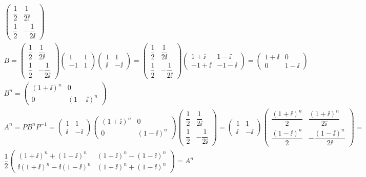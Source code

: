 \begin{gather*}
\left( \begin{array}{cc}
\dfrac{1}{2} & \dfrac{1}{2\ii}\\
\dfrac{1}{2} & -\dfrac{1}{2\ii}
\end{array} \right)\\
B=
\left( \begin{array}{cc}
\dfrac{1}{2} & \dfrac{1}{2\ii}\\
\dfrac{1}{2} & -\dfrac{1}{2\ii}
\end{array} \right)
\left( \begin{array}{cc}
1 & 1\\
-1 & 1
\end{array} \right)
\left( \begin{array}{cc}
1 & 1\\
\ii & -\ii
\end{array} \right)
=
\left( \begin{array}{cc}
\dfrac{1}{2} & \dfrac{1}{2\ii}\\
\dfrac{1}{2} & -\dfrac{1}{2\ii}
\end{array} \right)
\left( \begin{array}{cc}
1+\ii & 1-\ii \\
-1+\ii & -1-\ii
\end{array} \right) 
=
\left( \begin{array}{cc}
1+\ii & 0\\
0 & 1-\ii
\end{array} \right)
\\
B^n =
\left( \begin{array}{cc}
(1+\ii)^n & 0\\
0 & (1-\ii)^n
\end{array} \right)
\\
A^n=PB^{n}P^{-1} =
\left( \begin{array}{cc}
1 & 1 \\
\ii & -\ii
\end{array} \right)
\left( \begin{array}{cc}
(1+\ii)^n & 0\\
0 & (1-\ii)^n
\end{array} \right)
\left( \begin{array}{cc}
\dfrac{1}{2} & \dfrac{1}{2\ii}\\
\dfrac{1}{2} & -\dfrac{1}{2\ii}
\end{array} \right) 
=
\left( \begin{array}{cc}
1 & 1 \\
\ii & -\ii
\end{array} \right)
\left( \begin{array}{cc}
\dfrac{(1+\ii)^n}{2} & \dfrac{(1+\ii)^n}{2\ii} \\
\dfrac{(1-\ii)^n}{2} & -\dfrac{(1-\ii)^n}{2\ii}
\end{array} \right)
=\\
\dfrac{1}{2}
\left( \begin{array}{cc}
(1+\ii)^n +(1-\ii)^n & (1+\ii)^n - (1-\ii)^n \\
\ii (1+\ii)^n - \ii (1-\ii)^n & (1+\ii)^n + (1-\ii)^n
\end{array} \right) = A^n
\end{gather*}